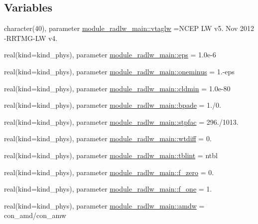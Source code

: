 \subsection*{Variables}
\begin{DoxyCompactItemize}
\item 
character(40), parameter \hyperlink{namespacemodule__radlw__main_a8d63a28d2550f8e193619e46a4c47d70}{module\+\_\+radlw\+\_\+main\+::vtaglw} =\textquotesingle{}N\+C\+EP LW v5. Nov 2012 -\/R\+R\+T\+MG-\/LW v4. \textquotesingle{}
\item 
real(kind=kind\+\_\+phys), parameter \hyperlink{namespacemodule__radlw__main_ac82309fd8d0e351ac37b276833a10376}{module\+\_\+radlw\+\_\+main\+::eps} = 1.\+0e-\/6
\item 
real(kind=kind\+\_\+phys), parameter \hyperlink{namespacemodule__radlw__main_a8c35a92c2a08663ce04bdf9de8717247}{module\+\_\+radlw\+\_\+main\+::oneminus} = 1.-\/eps
\item 
real(kind=kind\+\_\+phys), parameter \hyperlink{namespacemodule__radlw__main_ac55ad4a1ff397794e054be6647bafb73}{module\+\_\+radlw\+\_\+main\+::cldmin} = 1.\+0e-\/80
\item 
real(kind=kind\+\_\+phys), parameter \hyperlink{namespacemodule__radlw__main_a5c63b9836ad5735dd3d0811ff527c41c}{module\+\_\+radlw\+\_\+main\+::bpade} = 1./0.
\item 
real(kind=kind\+\_\+phys), parameter \hyperlink{namespacemodule__radlw__main_a483b88df2bdada7ef349d9530f91b762}{module\+\_\+radlw\+\_\+main\+::stpfac} = 296./1013.
\item 
real(kind=kind\+\_\+phys), parameter \hyperlink{namespacemodule__radlw__main_af1a0ca36bfce779493a7d1a4b81f6f73}{module\+\_\+radlw\+\_\+main\+::wtdiff} = 0.
\item 
real(kind=kind\+\_\+phys), parameter \hyperlink{namespacemodule__radlw__main_af6b84954042db7b1e2a6abdb4d401ccf}{module\+\_\+radlw\+\_\+main\+::tblint} = ntbl
\item 
real(kind=kind\+\_\+phys), parameter \hyperlink{namespacemodule__radlw__main_a9b8f65236249b31c8f9fcf1cfd0e7baa}{module\+\_\+radlw\+\_\+main\+::f\+\_\+zero} = 0.
\item 
real(kind=kind\+\_\+phys), parameter \hyperlink{namespacemodule__radlw__main_a518605a1451822f1888c6c7e85e07328}{module\+\_\+radlw\+\_\+main\+::f\+\_\+one} = 1.
\item 
real(kind=kind\+\_\+phys), parameter \hyperlink{namespacemodule__radlw__main_a9845c3a6eaa014e6a310fe1436162e37}{module\+\_\+radlw\+\_\+main\+::amdw} = con\+\_\+amd/con\+\_\+amw

\end{DoxyCompactItemize}
